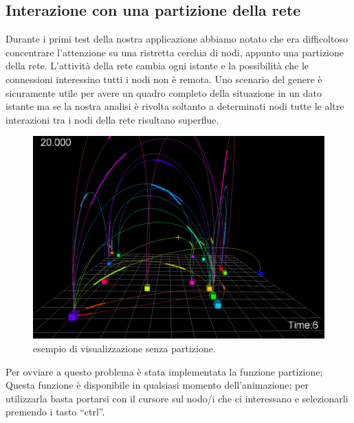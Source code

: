 \documentclass[a4paper,12pt]{article}
\begin{document}
 
 
\subsection{Interazione con una partizione della rete}
Durante i primi test della nostra applicazione abbiamo notato che era difficoltoso concentrare l'attenzione su una ristretta cerchia di nodi, appunto una  partizione della rete. L'attività della rete cambia ogni istante e la possibilità che le connessioni  interessino tutti  i nodi non \`e remota. Uno scenario del genere \`e sicuramente utile per avere un quadro completo della situazione  in un dato istante ma se la nostra analisi \`e rivolta soltanto a determinati nodi tutte le altre interazioni tra i nodi della rete risultano superflue.

\begin{figure}[htb!]
 \begin{center}
  \includegraphics[width=\textwidth]{images/image2.png}
 \end{center}
 \caption{esempio di visualizzazione senza partizione.}
 \label{fig:slider}
\end{figure}
 
Per ovviare a questo problema \`e stata implementata la funzione partizione; 
Questa funzione \`e disponibile  in qualsiasi momento dell'animazione; per utilizzarla basta portarsi con il cursore sul nodo/i che ci interessano e selezionarli premendo i tasto “ctrl”.
\end{document}
